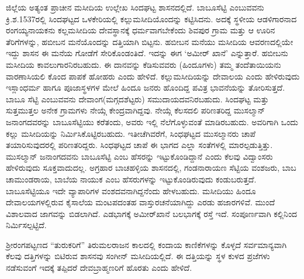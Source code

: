 ಜಿಲ್ಲೆಯ ಅತ್ಯಂತ ಪ್ರಾಚೀನ ಮಸೀದಿಯ ಉಲ್ಲೇಖ ಸಿಂದಘಟ್ಟ ಶಾಸನದಲ್ಲಿದೆ. ಬಾಬೂಸೆಟ್ಟಿ ಎಂಬುವವನು ಕ್ರಿ.ಶ.1537ರಲ್ಲಿ ಸಿಂದಘಟ್ಟದ ಒಳಕೇರಿಯಲ್ಲಿ ಕಲ್ಲುಮಸೀದಿಯೊಂದನ್ನು ಕಟ್ಟಿಸಿದನು. ಅದಕ್ಕೆ ಸ್ಥಳೀಯ ಆಡಳಿಗಾರನಾದ ರಂಗಯ್ಯನಾಯಕನು ಕಲ್ಲಮಸೀದಿಯ ದೇವಸ್ಥಾನಕ್ಕೆ ಧರ್ಮವಾಗಬೇಕೆಂದು ಶಿವಪುರ ಗ್ರಾಮ ಮತ್ತು ಆ ಊರಿನ ತೆರಿಗೆಗಳನ್ನು, ಹಬೀಬನ ಮನೆಯೊಂದನ್ನು ದತ್ತಿಯಾಗಿ ಬಿಟ್ಟನು. ಹಬೀಬನ ಮನೆಯು ಮಸೀದಿಯ ಆವರಣದಲ್ಲಿಯೇ ಇದ್ದು ಶಾಸನ ಈ ಮನೆಯ ಗೋಡೆಗೆ ಸೇರಿಕೊಂಡಂತಿದೆ. ಇದನ್ನು ಈಗ ‘ಅಮೀರ್​ ಖಾನೆ’ ಎನ್ನುತ್ತಾರೆ. ಹಬೀಬನು ಮಸೀದಿಯ ಕಾವಲುಗಾರನಿರಬಹುದು. ಈ ದಾನವನ್ನು ಕೆಡಿಸುವವರು (ಹಿಂದೂಗಳು) ತಮ್ಮ ತಂದೆತಾಯಿಯನು ವಾರಣಾಸಿಯಲಿ ಕೊಂದ ಪಾಪಕೆ ಹೋಹರು ಎಂದು ಹೇಳಿದೆ. ಕಲ್ಲುಮಸೀದಿಯನ್ನು ದೇವಾಲಯ ಎಂದು ಹೇಳಿರುವುದು ಇಸ್ಲಾಂಧರ್ಮ ಹಾಗೂ ಪೂಜಾಸ್ಥಳಗಳ ಮೇಲೆ ಹಿಂದೂ ಜನರು ಹೊಂದಿದ್ದ ಪವಿತ್ರ ಭಾವನೆಯನ್ನು ತೋರಿಸುತ್ತದೆ. ಬಾಬೂ ಸೆಟ್ಟಿ ಎಂಬುವವನು ದೇವಾಂಗ(ಮಗ್ಗದಶೆಟ್ಟರು) ಸಮುದಾಯದವನಿರಬಹುದು. ಸಿಂದಘಟ್ಟ ಮತ್ತು ಸುತ್ತಮುತ್ತಲ ಅನೇಕ ಗ್ರಾಮಗಳು ನೇಯ್ಗೆ ಕೇಂದ್ರವಾಗಿದ್ದವು. ನೇಯ್ಗೆ ಕೆಲಸದಲಿ ಪರಿಣತರಿದ್ದ ಮುಸಲ್ಮಾನ್​ ಜನಾಂಗದವರನ್ನು ಬಾಬೂಸೆಟ್ಟಿಯು ಕರೆತಂದು, ಅವರು ಇಲ್ಲಿ ನೆಲೆಗೊಳ್ಳುವಂತೆ ಮಾಡಿರಬಹುದು. ಅವರಿಗಾಗಿ ಒಂದು ಕಲ್ಲು ಮಸೀದಿಯನ್ನು ನಿರ್ಮಿಸಿಕೊಟ್ಟಿರಬಹುದು. ಇತೀಚೆಗಿವರೆಗೆ, ಸಿಂಧಘಟ್ಟದ ಮುಸಲ್ಮಾನರು ಚಾಪೆ ತಯಾರಿಸುವುದರಲ್ಲಿ ಪರಿಣತರಿದ್ದರು. ಸಿಂಧಘಟ್ಟದ ಚಾಪೆ ಈ ಭಾಗದ ಎಲ್ಲಾ ಸಂತೆಗಳಲ್ಲಿ ಮಾರಲ್ಪಡುತ್ತಿತ್ತು. ಮುಸಲ್ಮಾನ್​ ಜನಾಂಗದವನು ಬಾಬೂಸೆಟ್ಟಿ ಎಂಬ ಹೆಸರನ್ನು ಇಟ್ಟುಕೊಂಡಿದ್ದಾನೆ ಎಂದು ಕೆಲವು ವಿದ್ವಾಂಸರು ಹೇಳಿರುವುದು ಸೂಕ್ತವಾದುದಲ್ಲ. ಅಗ್ರಹಾರ ಬಾಚಹಳ್ಳಿಯ ಶಾಸನದಲ್ಲಿ, ಗಂಡನಾರಾಯಣ ಸೆಟ್ಟಿಯ ವಂಶಜರು, ಬಾಬ ಚಾಮುಂಡರಾಯ, ಬಾಬೆಯ ನಾಯುಕ ಎಂಬ ಹೆಸರುಗಳನ್ನು ಇಟ್ಟುಕೊಂಡಿರುವುದು ಕಂಡುಬರುತ್ತದೆ. ಬಾಬೂಸೆಟ್ಟಿಯೂ ಇದೇ ವ್ಯಾಪಾರಿಗಳ ವಂಶದವನಾಗಿದ್ದನೆಂದು ಹೇಳಬಹುದು. ಮಸೀದಿಯು ಹಿಂದೂ ದೇವಾಲಯಗಳಲ್ಲಿರುವ ಕೈಸಾಲೆಯ ಮಂಟಪದಂತಹ ವಾಸ್ತುರಚನೆಯಾಗಿದ್ದು ಎರಡು ಹಜಾರಗಳಿವೆ. ಮುಂದೆ ವಿಶಾಲವಾದ ಜಾಗವನ್ನು ಬಿಡಲಾಗಿದೆ. ಎಡಭಾಗಕ್ಕೆ ಅಮೀರ್​ಖಾನೆ ಬಲಭಾಗಕ್ಕೆ ರಸ್ತೆ ಇದೆ. ಸಂಪೂರ್ಣವಾಗಿ ಕಲ್ಲಿನಿಂದ ನಿರ್ಮಿಸಲ್ಪಟ್ಟಿದೆ.

ಶ‍್ರೀರಂಗಪಟ್ಟಣದ “ತುರುಕರಿಗೆ” ತಿರುಮಲರಾಜನ ಕಾಲದಲ್ಲಿ ಕಂದಾಯ ಕಾಣಿಕೆಗಳನ್ನು ಕೊಳ್ಳದೆ ಸರ್ವಮಾನ್ಯವಾಗಿ ಕೆಲವು ದತ್ತಿಗಳನ್ನು ಬಿಟಿರುವ ಶಾಸನವು ಸಂಗೀನ್​ ಮಸೀದಿಯಲ್ಲಿದೆ. ಈ ದತ್ತಿಯನ್ನು ಸ್ಥಳ ಕುಳದ ಪ್ರಜೆಗಳು ನಡೆಸುವಂಗೆ ಇದಕ್ಕೆ ತಪ್ಪಿದರೆ ದೇವಬ್ರಾಹ್ಮಣರಿಗೆ ಹೊರತು ಎಂದು ಹೇಳಿದೆ.

